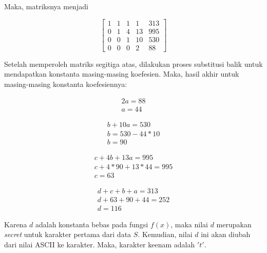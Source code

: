 Maka, matriksnya menjadi

\begin{center}
	\setlength\arraycolsep{15pt}
	\[
	\begin{bmatrix}
			1 	& 1 	& 1 	& 1 		& 313 	\\[1em]
			0 	& 1 	& 4 	& 13 		& 995		\\[1em]
			0 	& 0 	& 1 	& 10 		& 530		\\[1em]
			0 	& 0 	& 0 	& 2 		& 88
	\end{bmatrix}
	\]
\end{center}

Setelah memperoleh matriks segitiga atas, dilakukan proses substitusi balik untuk mendapatkan konstanta masing-masing koefesien. Maka, hasil akhir untuk masing-masing konstanta koefesiennya:

\begin{gather*}
	2a = 88 \\
	a = 44
\end{gather*}

\begin{gather*}
	b + 10a = 530 \\
	b = 530 - 44*10 \\
	b = 90
\end{gather*}

\begin{gather*}
	c + 4b + 13a = 995 \\
	c + 4*90 + 13*44 = 995 \\
	c = 63
\end{gather*}

\begin{gather*}
	d + c + b + a = 313 \\
	d + 63 + 90 + 44 = 252 \\
	d = 116
\end{gather*}

Karena \begin{math}d\end{math} adalah konstanta bebas pada fungsi \begin{math}f(x)\end{math}, maka nilai \begin{math}d\end{math} merupakan \textit{secret} untuk karakter pertama dari data \begin{math}S\end{math}. Kemudian, nilai \begin{math}d\end{math} ini akan diubah dari nilai ASCII ke karakter. Maka, karakter keenam adalah \begin{math}'t'\end{math}.

